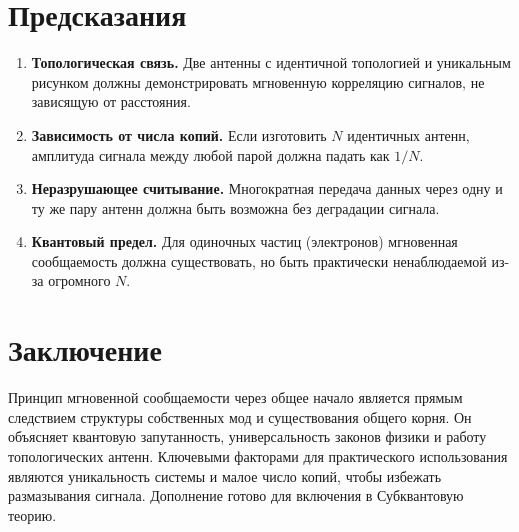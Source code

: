 \documentclass[12pt,a4paper]{article}
\begin{document}
\section{Предсказания}
\begin{enumerate}[label=\arabic*.]
    \item \textbf{Топологическая связь.} Две антенны с идентичной топологией и уникальным рисунком должны демонстрировать мгновенную корреляцию сигналов, не зависящую от расстояния.
    \item \textbf{Зависимость от числа копий.} Если изготовить $N$ идентичных антенн, амплитуда сигнала между любой парой должна падать как $1/N$.
    \item \textbf{Неразрушающее считывание.} Многократная передача данных через одну и ту же пару антенн должна быть возможна без деградации сигнала.
    \item \textbf{Квантовый предел.} Для одиночных частиц (электронов) мгновенная сообщаемость должна существовать, но быть практически ненаблюдаемой из-за огромного $N$.
\end{enumerate}

\section{Заключение}
Принцип мгновенной сообщаемости через общее начало является прямым следствием структуры собственных мод и существования общего корня. Он объясняет квантовую запутанность, универсальность законов физики и работу топологических антенн. Ключевыми факторами для практического использования являются уникальность системы и малое число копий, чтобы избежать размазывания сигнала. Дополнение готово для включения в Субквантовую теорию.
\end{document}
